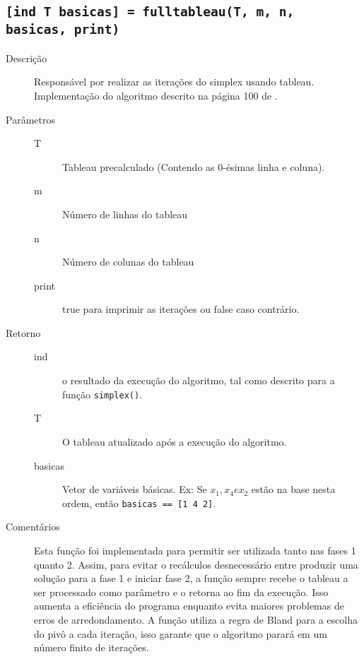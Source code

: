 \documentclass[brazil,times]{abnt}
\begin{document}
\subsection*{\texttt{[ind T basicas] = fulltableau(T, m, n, basicas, print)}}
\begin{description}
	\item[Descrição] Responsável por realizar as iterações do simplex usando tableau. Implementação do algoritmo descrito na página 100 de \cite{Bertsimas:1997:ILO:548834}.
	\item[Parâmetros] 
		\begin{description}
		 \item[T] Tableau precalculado (Contendo as 0-ésimas linha e coluna).
		 \item[m] Número de linhas do tableau
		 \item[n] Número de colunas do tableau
		 \item[print] true para imprimir as iterações ou false caso contrário.
		\end{description}
	\item[Retorno]
		\begin{description}
		 \item[ind] o resultado da execução do algoritmo, tal como descrito para a função \texttt{simplex()}.
		 \item[T] O tableau atualizado após a execução do algoritmo.
		 \item[basicas] Vetor de variáveis básicas. Ex: Se $x_1, x_4 e x_2$ estão na base nesta ordem, então \texttt{basicas == [1 4 2]}.
		\end{description}
	\item[Comentários] Esta função foi implementada para permitir ser utilizada tanto nas fases 1 quanto 2. Assim, para evitar o recálculos desnecessário entre produzir uma solução para a fase 1 e iniciar fase 2, a função sempre recebe o tableau a ser processado como parâmetro e o retorna ao fim da execução. Isso aumenta a eficiência do programa enquanto evita maiores problemas de erros de arredondamento. A função utiliza a regra de Bland para a escolha do pivô a cada iteração, isso garante que o algoritmo parará em um número finito de iterações.
\end{description}
\end{document}
